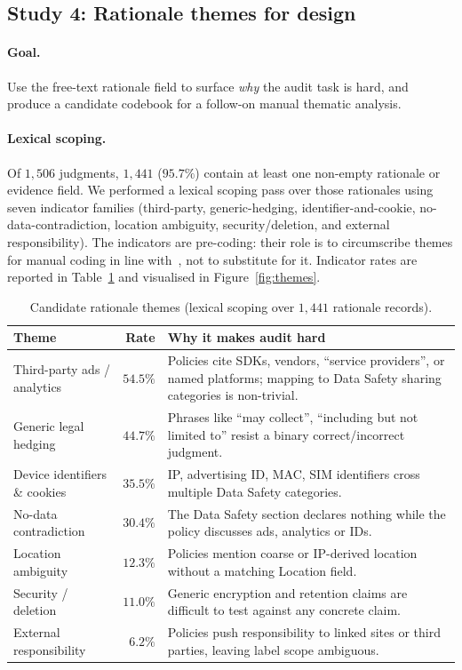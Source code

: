 \documentclass[11pt,a4paper]{article}
\begin{document}
\subsection{Study 4: Rationale themes for design}
\label{sec:study4}
\paragraph{Goal.} Use the free-text rationale field to surface
\emph{why} the audit task is hard, and produce a candidate codebook
for a follow-on manual thematic analysis.

\paragraph{Lexical scoping.}
Of $1{,}506$ judgments, $1{,}441$ ($95.7\%$) contain at least one
non-empty rationale or evidence field. We performed a lexical scoping
pass over those rationales using seven indicator families (third-party,
generic-hedging, identifier-and-cookie, no-data-contradiction, location
ambiguity, security/deletion, and external responsibility). The
indicators are pre-coding: their role is to circumscribe themes for
manual coding in line with~\citet{braun2006using}, not to substitute
for it. Indicator rates are reported in Table~\ref{tab:themes} and
visualised in Figure~\ref{fig:themes}.

\begin{table}[t]
\centering\small
\caption{Candidate rationale themes (lexical scoping over
$1{,}441$ rationale records).}
\label{tab:themes}
\begin{tabular}{p{}rp{}}
\toprule
Theme & Rate & Why it makes audit hard\\
\midrule
Third-party ads / analytics  & $54.5\%$ & Policies cite SDKs, vendors,
   ``service providers'', or named platforms; mapping to Data Safety
   sharing categories is non-trivial.\\
Generic legal hedging        & $44.7\%$ & Phrases like ``may collect'',
   ``including but not limited to'' resist a binary correct/incorrect
   judgment.\\
Device identifiers \& cookies& $35.5\%$ & IP, advertising ID, MAC,
   SIM identifiers cross multiple Data Safety categories.\\
No-data contradiction        & $30.4\%$ & The Data Safety section
   declares nothing while the policy discusses ads, analytics or IDs.\\
Location ambiguity           & $12.3\%$ & Policies mention coarse or
   IP-derived location without a matching Location field.\\
Security / deletion          & $11.0\%$ & Generic encryption and
   retention claims are difficult to test against any concrete claim.\\
External responsibility      & $6.2\%$  & Policies push responsibility
   to linked sites or third parties, leaving label scope ambiguous.\\
\bottomrule
\end{tabular}
\end{table}
\end{document}
